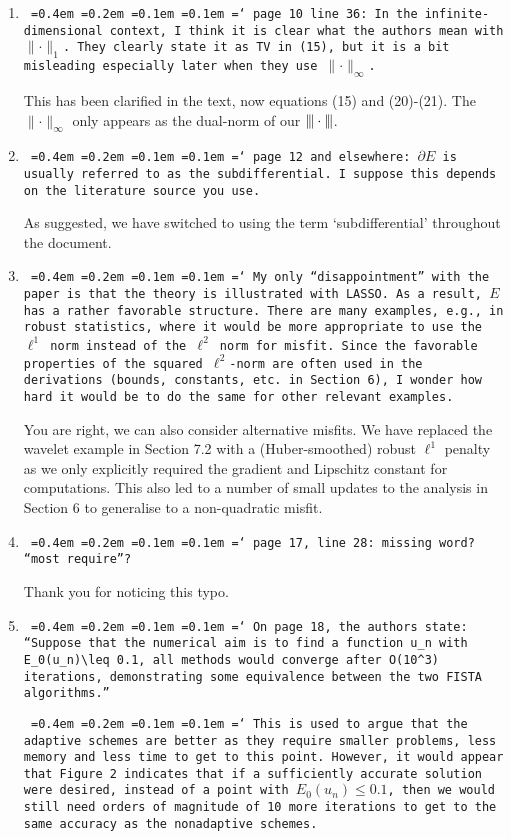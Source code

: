 \documentclass[12pt]{article}
\newcommand*\justify{%
	\fontdimen2\font=0.4em%
	\fontdimen3\font=0.2em%
	\fontdimen4\font=0.1em%
	\fontdimen7\font=0.1em%
	\hyphenchar\font=`\-%
}
\newcommand{\review}[1]{\texttt{\justify{#1}}}
\begin{document}
\begin{enumerate}
	\item \review{page 10 line 36: In the infinite-dimensional context, I think it is clear what the authors mean with $\lVert\cdot\rVert_1$. They clearly state it as TV in (15), but it is a bit misleading especially later when they use $\lVert\cdot\rVert_\infty$.}
	
	This has been clarified in the text, now equations (15) and (20)-(21). The $\lVert\cdot\rVert_\infty$ only appears as the dual-norm of our ${\vert\kern-0.25ex\vert\kern-0.25ex\vert \cdot \vert\kern-0.25ex\vert\kern-0.25ex\vert}$.
	
	\item \review{page 12 and elsewhere: $\partial E$ is usually referred to as the subdifferential. I suppose this depends on the literature source you use.}
	
	As suggested, we have switched to using the term `subdifferential' throughout the document.
	
	\item \review{My only ``disappointment'' with the paper is that the theory is illustrated with LASSO. As a result, $E$ has a rather favorable structure. There are many examples, e.g., in robust statistics, where it would be more appropriate to use the $\ell^1$ norm instead of the $\ell^2$ norm for misfit. Since the favorable properties of the squared $\ell^2$-norm are often used in the derivations (bounds, constants, etc. in Section 6), I wonder how hard it would be to do the same for other relevant examples.}
	
	You are right, we can also consider alternative misfits. We have replaced the wavelet example in Section 7.2 with a (Huber-smoothed) robust $\ell^1$ penalty as we only explicitly required the gradient and Lipschitz constant for computations. This also led to a number of small updates to the analysis in Section 6 to generalise to a non-quadratic misfit.
	
	\item \review{page 17, line 28: missing word? ``most require''?}
	
	Thank you for noticing this typo.
	
	\item \review{On page 18, the authors state: ``Suppose that the numerical aim is to find a function $u_n$ with $E_0(u_n)\leq 0.1$, all methods would converge after $O(10^3)$ iterations, demonstrating some equivalence between the two FISTA algorithms.''}
	
	\review{This is used to argue that the adaptive schemes are better as they require smaller problems, less memory and less time to get to this point. However, it would appear that Figure 2 indicates that if a sufficiently accurate solution were desired, instead of a point with $E_0(u_n)\leq 0.1$, then we would still need orders of magnitude of 10 more iterations to get to the same accuracy as the nonadaptive schemes.}
	

\end{enumerate}
\end{document}
